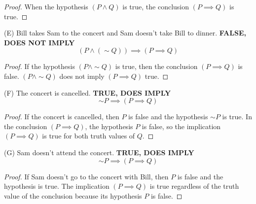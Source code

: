 \documentclass[12pt]{article}
\newenvironment{problem}[2][Problem]{\begin{trivlist}
		\item[\hskip \labelsep {\bfseries #1}\hskip \labelsep {\bfseries #2.}]}{\end{trivlist}}
\begin{document}
\begin{problem}{28}
	\begin{proof}
		When the hypothesis $(P\wedge Q)$ is true, the conclusion $(P \implies Q)$ is true.
	\end{proof}
	(E) Bill takes Sam to the concert and Sam doesn't take Bill to dinner. \textbf{ FALSE, DOES NOT IMPLY}
	\begin{equation}
		(P \wedge (\sim Q)) \implies (P \implies Q)
	\end{equation}
	\begin{proof}
		If the hypothesis $(P \wedge \sim Q)$ is true, then the conclusion $(P \implies Q)$ is false. $(P \wedge \sim Q)$ does not imply $(P \implies Q)$ true. 
	\end{proof}
 	(F) The concert is cancelled. \textbf{ TRUE, DOES IMPLY}
 	\begin{equation}
 		\sim P \implies (P\implies Q)
 	\end{equation}
 	\begin{proof}
 		If the concert is cancelled, then $P$ is false and the hypothesis $\sim P$ is true. In the conclusion $(P\implies Q)$, the hypothesis $P$ is false, so the implication $(P\implies Q)$ is true for both truth values of $Q$.
 	\end{proof}
 	(G) Sam doesn't attend the concert. \textbf{ TRUE, DOES IMPLY}
 	\begin{equation}
 		\sim P \implies (P\implies Q)
 	\end{equation}
 	\begin{proof}
 		If Sam doesn't go to the concert with Bill, then $P$ is false and the hypothesis is true. The implication $(P\implies Q)$ is true regardless of the truth value of the conclusion because its hypothesis $P$ is false.
 	\end{proof}
\end{problem}
\end{document}
